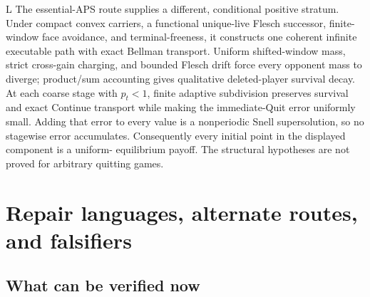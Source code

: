 \documentclass[11pt]{article}
\newcommand{\LTag}{\textsf{L}}
\newcommand{\Prod}{\LTag}
\newcommand{\Status}[1]{#1}
\begin{document}
\Status{\Prod} The essential-APS route supplies a different, conditional
positive stratum.  Under compact convex carriers, a functional unique-live
Flesch successor, finite-window face avoidance, and terminal-freeness, it
constructs one coherent infinite executable path with exact Bellman transport.
Uniform shifted-window mass, strict cross-gain charging, and bounded Flesch
drift force every opponent mass to diverge; product/sum accounting gives
qualitative deleted-player survival decay. At each coarse stage with
\(p_t<1\), finite adaptive subdivision preserves survival and exact Continue
transport while making the immediate-Quit error uniformly small. Adding that
error to every value
is a nonperiodic Snell supersolution, so no stagewise error accumulates.
Consequently every initial point in the displayed component is a uniform-
equilibrium payoff.  The structural hypotheses are not proved for arbitrary
quitting games.

\section{Repair languages, alternate routes, and falsifiers}

\subsection{What can be verified now}
\end{document}
